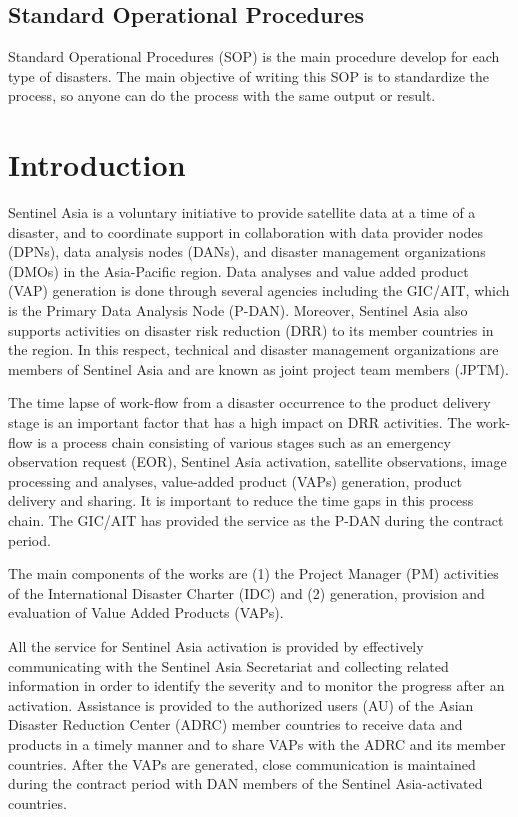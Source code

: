 \documentclass[]{book}
\theoremstyle{definition}
\theoremstyle{definition}
\theoremstyle{definition}
\theoremstyle{remark}
\begin{document}
\section{Standard Operational
Procedures}\label{standard-operational-procedures}

Standard Operational Procedures (SOP) is the main procedure develop for
each type of disasters. The main objective of writing this SOP is to
standardize the process, so anyone can do the process with the same
output or result.

\chapter{Introduction}\label{intro}

Sentinel Asia is a voluntary initiative to provide satellite data at a
time of a disaster, and to coordinate support in collaboration with data
provider nodes (DPNs), data analysis nodes (DANs), and disaster
management organizations (DMOs) in the Asia-Pacific region. Data
analyses and value added product (VAP) generation is done through
several agencies including the GIC/AIT, which is the Primary Data
Analysis Node (P-DAN). Moreover, Sentinel Asia also supports activities
on disaster risk reduction (DRR) to its member countries in the region.
In this respect, technical and disaster management organizations are
members of Sentinel Asia and are known as joint project team members
(JPTM).

The time lapse of work-flow from a disaster occurrence to the product
delivery stage is an important factor that has a high impact on DRR
activities. The work-flow is a process chain consisting of various
stages such as an emergency observation request (EOR), Sentinel Asia
activation, satellite observations, image processing and analyses,
value-added product (VAPs) generation, product delivery and sharing. It
is important to reduce the time gaps in this process chain. The GIC/AIT
has provided the service as the P-DAN during the contract period.

The main components of the works are (1) the Project Manager (PM)
activities of the International Disaster Charter (IDC) and (2)
generation, provision and evaluation of Value Added Products (VAPs).

All the service for Sentinel Asia activation is provided by effectively
communicating with the Sentinel Asia Secretariat and collecting related
information in order to identify the severity and to monitor the
progress after an activation. Assistance is provided to the authorized
users (AU) of the Asian Disaster Reduction Center (ADRC) member
countries to receive data and products in a timely manner and to share
VAPs with the ADRC and its member countries. After the VAPs are
generated, close communication is maintained during the contract period
with DAN members of the Sentinel Asia-activated countries.
\end{document}
